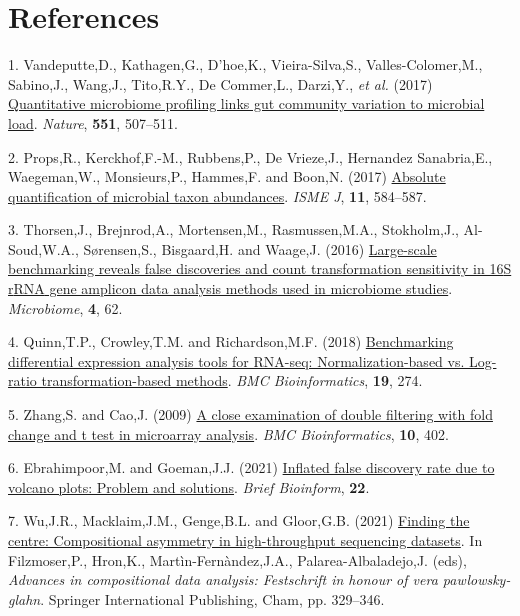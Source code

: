 \documentclass[
]{article}
\newlength{\cslhangindent}
\newenvironment{CSLReferences}[2] %
 {\begin{list}{}{%
  \setlength{\itemindent}{0pt}
  \setlength{\leftmargin}{0pt}
  \setlength{\parsep}{0pt}
  \ifodd #1
   \setlength{\leftmargin}{\cslhangindent}
   \setlength{\itemindent}{-1\cslhangindent}
  \fi
  \setlength{\itemsep}{#2\baselineskip}}}
 {\end{list}}
\begin{document}
\section*{References}\label{references}

\label{refs}
\begin{CSLReferences}{1}{1}
1. Vandeputte,D., Kathagen,G., D'hoe,K., Vieira-Silva,S.,
Valles-Colomer,M., Sabino,J., Wang,J., Tito,R.Y., De Commer,L.,
Darzi,Y., \emph{et al.} (2017)
\href{https://doi.org/10.1038/nature24460}{Quantitative microbiome
profiling links gut community variation to microbial load}.
\emph{Nature}, \textbf{551}, 507--511.

2. Props,R., Kerckhof,F.-M., Rubbens,P., De Vrieze,J., Hernandez
Sanabria,E., Waegeman,W., Monsieurs,P., Hammes,F. and Boon,N. (2017)
\href{https://doi.org/10.1038/ismej.2016.117}{Absolute quantification of
microbial taxon abundances}. \emph{ISME J}, \textbf{11}, 584--587.

3. Thorsen,J., Brejnrod,A., Mortensen,M., Rasmussen,M.A., Stokholm,J.,
Al-Soud,W.A., Sørensen,S., Bisgaard,H. and Waage,J. (2016)
\href{https://doi.org/10.1186/s40168-016-0208-8}{Large-scale
benchmarking reveals false discoveries and count transformation
sensitivity in 16{S} r{RNA} gene amplicon data analysis methods used in
microbiome studies}. \emph{Microbiome}, \textbf{4}, 62.

4. Quinn,T.P., Crowley,T.M. and Richardson,M.F. (2018)
\href{https://doi.org/10.1186/s12859-018-2261-8}{Benchmarking
differential expression analysis tools for RNA-seq: Normalization-based
vs. Log-ratio transformation-based methods}. \emph{BMC Bioinformatics},
\textbf{19}, 274.

5. Zhang,S. and Cao,J. (2009)
\href{https://doi.org/10.1186/1471-2105-10-402}{A close examination of
double filtering with fold change and t test in microarray analysis}.
\emph{BMC Bioinformatics}, \textbf{10}, 402.

6. Ebrahimpoor,M. and Goeman,J.J. (2021)
\href{https://doi.org/10.1093/bib/bbab053}{Inflated false discovery rate
due to volcano plots: Problem and solutions}. \emph{Brief Bioinform},
\textbf{22}.

7. Wu,J.R., Macklaim,J.M., Genge,B.L. and Gloor,G.B. (2021)
\href{https://doi.org/10.1007/978-3-030-71175-7_17}{Finding the centre:
Compositional asymmetry in high-throughput sequencing datasets}. In
Filzmoser,P., Hron,K., Martìn-Fernàndez,J.A., Palarea-Albaladejo,J.
(eds), \emph{Advances in compositional data analysis: Festschrift in
honour of vera pawlowsky-glahn}. Springer International Publishing,
Cham, pp. 329--346.


\end{CSLReferences}
\end{document}
